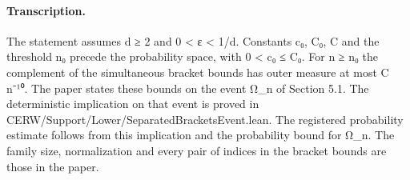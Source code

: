 \paragraph{Transcription.}
The statement assumes d ≥ 2 and 0 < ε < 1/d. Constants c₀, C₀, C and the threshold n₀ precede the probability space, with 0 < c₀ ≤ C₀. For n ≥ n₀ the complement of the simultaneous bracket bounds has outer measure at most C n⁻¹⁰. The paper states these bounds on the event Ω_n of Section 5.1. The deterministic implication on that event is proved in CERW/Support/Lower/SeparatedBracketsEvent.lean. The registered probability estimate follows from this implication and the probability bound for Ω_n. The family size, normalization and every pair of indices in the bracket bounds are those in the paper.
